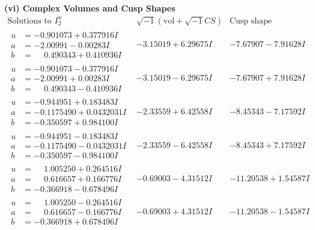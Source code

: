 \documentclass[1p]{elsarticle_modified}
\theoremstyle{definition}
\newcommand{\I}{\sqrt{-1}}
\begin{document}
\newpage\flushleft \textbf{(vi) Complex Volumes and Cusp Shapes}
$$\begin{array}{c|c|c}  
\text{Solutions to }I^u_{2}& \I (\text{vol} + \sqrt{-1}CS) & \text{Cusp shape}\\
 \hline 
\begin{aligned}
u &= -0.901073 + 0.377916 I \\
a &= -2.00991 - 0.00283 I \\
b &= \phantom{-}0.490343 + 0.410936 I\end{aligned}
 & -3.15019 + 6.29675 I & -7.67907 - 7.91628 I \\ \hline\begin{aligned}
u &= -0.901073 - 0.377916 I \\
a &= -2.00991 + 0.00283 I \\
b &= \phantom{-}0.490343 - 0.410936 I\end{aligned}
 & -3.15019 - 6.29675 I & -7.67907 + 7.91628 I \\ \hline\begin{aligned}
u &= -0.944951 + 0.183483 I \\
a &= -0.1175490 + 0.0432031 I \\
b &= -0.350597 + 0.984100 I\end{aligned}
 & -2.33559 + 6.42558 I & -8.45343 - 7.17592 I \\ \hline\begin{aligned}
u &= -0.944951 - 0.183483 I \\
a &= -0.1175490 - 0.0432031 I \\
b &= -0.350597 - 0.984100 I\end{aligned}
 & -2.33559 - 6.42558 I & -8.45343 + 7.17592 I \\ \hline\begin{aligned}
u &= \phantom{-}1.005250 + 0.264516 I \\
a &= \phantom{-}0.616657 + 0.166776 I \\
b &= -0.366918 - 0.678496 I\end{aligned}
 & -0.69003 - 4.31512 I & -11.20538 + 1.54587 I \\ \hline\begin{aligned}
u &= \phantom{-}1.005250 - 0.264516 I \\
a &= \phantom{-}0.616657 - 0.166776 I \\
b &= -0.366918 + 0.678496 I\end{aligned}
 & -0.69003 + 4.31512 I & -11.20538 - 1.54587 I \\ \hline\begin{aligned}

\end{aligned}
\end{array}$$
\end{document}
